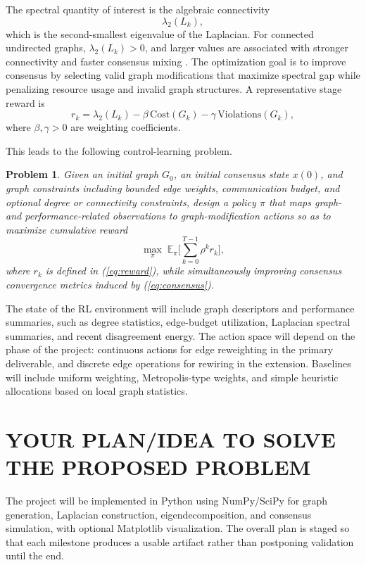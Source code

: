 \documentclass[letterpaper, 11 pt, journal, twoside]{IEEEtran}
\newtheorem{problem}{Problem}
\def\rep#1{(\ref{#1})}
\begin{document}
The spectral quantity of interest is the algebraic connectivity
\begin{equation}
\lambda_2(L_k),
\end{equation}
which is the second-smallest eigenvalue of the Laplacian. For connected undirected graphs, $\lambda_2(L_k) > 0$, and larger values are associated with stronger connectivity and faster consensus mixing \cite{Fiedler1973,OlfatiSaber2007}. The optimization goal is to improve consensus by selecting valid graph modifications that maximize spectral gap while penalizing resource usage and invalid graph structures. A representative stage reward is
\begin{equation}
r_k = \lambda_2(L_k) - \beta\, \mathrm{Cost}(G_k) - \gamma\, \mathrm{Violations}(G_k),
\label{eq:reward}
\end{equation}
where $\beta,\gamma > 0$ are weighting coefficients.

This leads to the following control-learning problem.

\begin{problem}
Given an initial graph $G_0$, an initial consensus state $x(0)$, and graph constraints including bounded edge weights, communication budget, and optional degree or connectivity constraints, design a policy $\pi$ that maps graph- and performance-related observations to graph-modification actions so as to maximize cumulative reward
\begin{equation}
\max_{\pi} \; \mathbb{E}_{\pi}\Bigg[\sum_{k=0}^{T-1} \rho^k r_k\Bigg],
\end{equation}
where $r_k$ is defined in \rep{eq:reward}, while simultaneously improving consensus convergence metrics induced by \rep{eq:consensus}.
\end{problem}

The state of the RL environment will include graph descriptors and performance summaries, such as degree statistics, edge-budget utilization, Laplacian spectral summaries, and recent disagreement energy. The action space will depend on the phase of the project: continuous actions for edge reweighting in the primary deliverable, and discrete edge operations for rewiring in the extension. Baselines will include uniform weighting, Metropolis-type weights, and simple heuristic allocations based on local graph statistics.

\section{YOUR PLAN/IDEA TO SOLVE THE PROPOSED PROBLEM}
The project will be implemented in Python using NumPy/SciPy for graph generation, Laplacian construction, eigendecomposition, and consensus simulation, with optional Matplotlib visualization. The overall plan is staged so that each milestone produces a usable artifact rather than postponing validation until the end.
\end{document}
